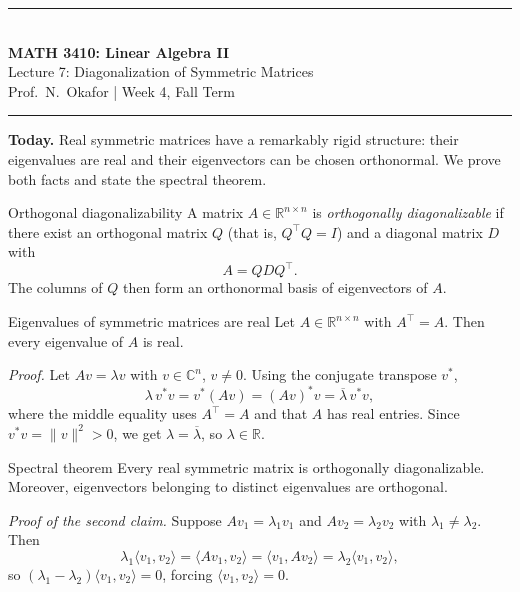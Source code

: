\documentclass[11pt]{article}
\begin{document}
\begin{center}
  {\color{accent}\rule{\linewidth}{2pt}}\\[8pt]
  {\Large\bfseries MATH 3410: Linear Algebra II}\\[4pt]
  {\large Lecture 7: Diagonalization of Symmetric Matrices}\\[4pt]
  Prof.\ N.\ Okafor \quad | \quad Week 4, Fall Term\\[6pt]
  {\color{accent}\rule{\linewidth}{0.8pt}}
\end{center}

\textbf{Today.} Real symmetric matrices have a remarkably rigid structure:
their eigenvalues are real and their eigenvectors can be chosen orthonormal.
We prove both facts and state the spectral theorem.

\begin{defbox}{Orthogonal diagonalizability}
A matrix $A \in \mathbb{R}^{n \times n}$ is \emph{orthogonally
diagonalizable} if there exist an orthogonal matrix $Q$ (that is,
$Q^{\top}Q = I$) and a diagonal matrix $D$ with
\[
  A = Q D Q^{\top}.
\]
The columns of $Q$ then form an orthonormal basis of eigenvectors of $A$.
\end{defbox}

\begin{thmbox}{Eigenvalues of symmetric matrices are real}
Let $A \in \mathbb{R}^{n \times n}$ with $A^{\top} = A$. Then every
eigenvalue of $A$ is real.
\end{thmbox}

\emph{Proof.} Let $Av = \lambda v$ with $v \in \mathbb{C}^n$, $v \neq 0$.
Using the conjugate transpose $v^{*}$,
\[
  \lambda\, v^{*}v = v^{*}(Av) = (Av)^{*}v = \overline{\lambda}\, v^{*}v,
\]
where the middle equality uses $A^{\top} = A$ and that $A$ has real entries.
Since $v^{*}v = \lVert v \rVert^2 > 0$, we get
$\lambda = \overline{\lambda}$, so $\lambda \in \mathbb{R}$. \qedsymbol

\begin{thmbox}{Spectral theorem}
Every real symmetric matrix is orthogonally diagonalizable. Moreover,
eigenvectors belonging to distinct eigenvalues are orthogonal.
\end{thmbox}

\emph{Proof of the second claim.} Suppose $Av_1 = \lambda_1 v_1$ and
$Av_2 = \lambda_2 v_2$ with $\lambda_1 \neq \lambda_2$. Then
\[
  \lambda_1 \langle v_1, v_2 \rangle
  = \langle A v_1, v_2 \rangle
  = \langle v_1, A v_2 \rangle
  = \lambda_2 \langle v_1, v_2 \rangle,
\]
so $(\lambda_1 - \lambda_2)\langle v_1, v_2 \rangle = 0$, forcing
$\langle v_1, v_2 \rangle = 0$. \qedsymbol
\end{document}
